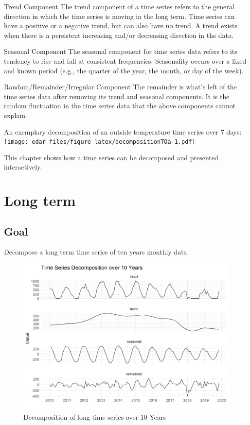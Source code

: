 \documentclass[
]{book}
\begin{document}
Trend Component
The trend component of a time series refers to the general direction in which the time series is moving in the long term. Time series can have a positive or a negative trend, but can also have no trend.
A trend exists when there is a persistent increasing and/or decreasing direction in the data.

Seasonal Component
The seasonal component for time series data refers to its tendency to rise and fall at consistent frequencies. Seasonality occurs over a fixed and known period (e.g., the quarter of the year, the month, or day of the week).

Random/Remainder/Irregular Component
The remainder is what's left of the time series data after removing its trend and seasonal components. It is the random fluctuation in the time series data that the above components cannot explain.

An exemplary decomposition of an outside temperature time series over 7 days:
\texttt{[image: edar\_files/figure-latex/decompositionTOa-1.pdf]}

This chapter shows how a time series can be decomposed and presented interactively.

\hypertarget{long-term}{%
\section{Long term}\label{long-term}}

\hypertarget{goal-4}{%
\subsection{Goal}\label{goal-4}}

Decompose a long term time series of ten years monthly data.

\begin{figure}
\includegraphics[width=0.7\linewidth]{images/plotDecompositionLong} \caption{Decomposition of long time series over 10 Years}\label{fig:unnamed-chunk-13}
\end{figure}
\end{document}
